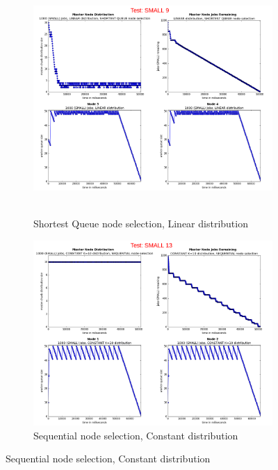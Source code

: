 \documentclass{article}
\begin{document}
\begin{figure}[p]
  \begin{subfigure}[b]{0.5\linewidth}
    \centering
    \hbox{\hspace{-5.0em} \includegraphics[width=1.2\linewidth]{combined_small_overview/case_small_9} }
    \caption{Shortest Queue node selection, Linear distribution} 
    \label{testSmall9} 
    \vspace{4ex}
  \end{subfigure}%
  \begin{subfigure}[b]{0.5\linewidth}
    \centering
    \includegraphics[width=1.2\linewidth]{combined_small_overview/case_small_13} 
    \caption{Sequential node selection, Constant distribution} 
    \label{testSmall13} 
    \vspace{4ex}
  \end{subfigure} 
  

\end{figure}
\end{document}
